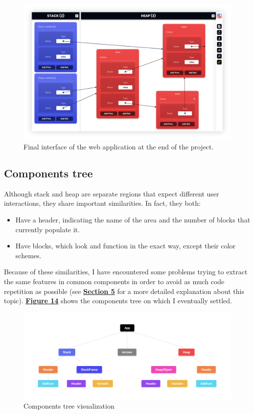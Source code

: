 \documentclass[]{usiinfbachelorproject}
\begin{document}
\begin{figure}[h!]
\centering
\includegraphics[width=\textwidth]{figures/final-interface.png}
\caption {Final interface of the web application at the end of the project.}
\end{figure}

\subsection{Components tree}

Although stack and heap are separate regions that expect different user interactions, they share important similarities. In fact, they both:

\begin{itemize}
	\item Have a header, indicating the name of the area and the number of blocks that currently populate it.
	\item Have blocks, which look and function in the exact way, except their color schemes.
\end{itemize}

\noindent Because of these similarities, I have encountered some problems trying to extract the same features in common components in order to avoid as much code repetition as possible (see \hyperref[]{\textbf{Section 5}} for a more detailed explanation about this topic). \hyperref[tree]{\textbf{Figure 14}} shows the components tree on which I eventually settled.

\begin{figure}[h!]
\centering
\includegraphics[width=\textwidth]{figures/tree.png}
\caption {Components tree visualization}
\label{tree}
\end{figure}
\end{document}
